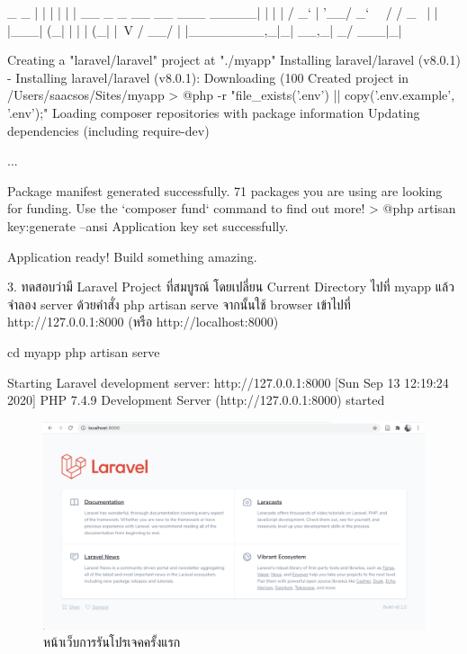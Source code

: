 \begin{out}{}
     _                               _
    | |                             | |
    | |     __ _ _ __ __ ___   _____| |
    | |    / _` | '__/ _` \ \ / / _ \ |
    | |___| (_| | | | (_| |\ V /  __/ |
    |______\__,_|_|  \__,_| \_/ \___|_|
    
    Creating a "laravel/laravel" project at "./myapp"
    Installing laravel/laravel (v8.0.1)
      - Installing laravel/laravel (v8.0.1): Downloading (100%
    Created project in /Users/saacsos/Sites/myapp
    > @php -r "file_exists('.env') || copy('.env.example', '.env');"
    Loading composer repositories with package information
    Updating dependencies (including require-dev)

    ...
    
    Package manifest generated successfully.
    71 packages you are using are looking for funding.
    Use the `composer fund` command to find out more!
    > @php artisan key:generate --ansi
    Application key set successfully.

    Application ready! Build something amazing.
\end{out}

3. ทดสอบว่ามี Laravel Project ที่สมบูรณ์ โดยเปลี่ยน Current Directory ไปที่ myapp 
แล้วจำลอง server ด้วยคำสั่ง php artisan serve จากนั้นใช้ browser 
เข้าไปที่ http://127.0.0.1:8000 (หรือ http://localhost:8000)
\begin{cli}{}
    cd myapp
    php artisan serve
\end{cli}

\begin{out}{}
    Starting Laravel development server: http://127.0.0.1:8000
    [Sun Sep 13 12:19:24 2020] PHP 7.4.9 Development Server (http://127.0.0.1:8000) started
\end{out}

\begin{figure}[h]
    \centering
    \includegraphics[width=1\textwidth]{images/ch2/01.png}
    \caption{หน้าเว็บการรันโปรเจคครั้งแรก}
\end{figure}

